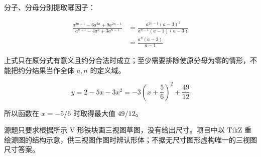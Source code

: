 \begin{answer}
分子、分母分别提取幂因子：

\nopagebreak[4]
\[
\begin{aligned}
\frac{a^{2n+1}-6a^{2n}+9a^{2n-1}}
{a^{n+1}-4a^n+3a^{n-1}}
&=\frac{a^{2n-1}(a-3)^2}{a^{n-1}(a-1)(a-3)}\\
&=\frac{a^n(a-3)}{a-1}
\end{aligned}
\]

上式只在原分式有意义且约分合法时成立；至少需要排除使原分母为零的情形，不能把约分结果当作全体 $a,n$ 的定义域。


\nopagebreak[4]
\[
y=2-5x-3x^2=-3\left(x+\frac56\right)^2+\frac{49}{12}
\]

所以函数在 $x=-5/6$ 时取得最大值 $49/12$。


源题只要求根据所示 V 形铁块画三视图草图，没有给出尺寸。项目中以 TikZ 重绘源图的结构示意，供三视图作图时辨认形体；不据无尺寸图形虚构唯一的三视图尺寸答案。



\gkanswer{答案（3）：$[0,1)\cup(1,2)$。}








\end{answer}
